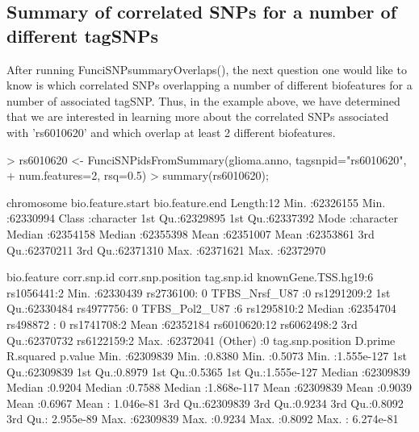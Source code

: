 \documentclass[a4paper]{article}
\begin{document}
\subsection*{Summary of correlated SNPs for a number of different tagSNPs}
After running FunciSNPsummaryOverlaps(), the next question one would like to 
know is which correlated SNPs overlapping a number of different biofeatures 
for a number of associated tagSNP. Thus, in the example above, we have 
determined that we are interested in learning more about the correlated 
SNPs associated with 'rs6010620' and which overlap at least 2 different 
biofeatures.
\begin{Schunk}
\begin{Sinput}
> rs6010620 <- FunciSNPidsFromSummary(glioma.anno, tagsnpid="rs6010620", 
+         num.features=2, rsq=0.5)
> summary(rs6010620);
\end{Sinput}
\begin{Soutput}
  chromosome        bio.feature.start  bio.feature.end   
 Length:12          Min.   :62326155   Min.   :62330994  
 Class :character   1st Qu.:62329895   1st Qu.:62337392  
 Mode  :character   Median :62354158   Median :62355398  
                    Mean   :62351007   Mean   :62353861  
                    3rd Qu.:62370211   3rd Qu.:62371310  
                    Max.   :62371621   Max.   :62372970  
                                                         
             bio.feature    corr.snp.id corr.snp.position      tag.snp.id
 knownGene.TSS.hg19:6    rs1056441:2    Min.   :62330439   rs2736100: 0  
 TFBS_Nrsf_U87     :0    rs1291209:2    1st Qu.:62330484   rs4977756: 0  
 TFBS_Pol2_U87     :6    rs1295810:2    Median :62354704   rs498872 : 0  
                         rs1741708:2    Mean   :62352184   rs6010620:12  
                         rs6062498:2    3rd Qu.:62370732                 
                         rs6122159:2    Max.   :62372041                 
                         (Other)  :0                                     
 tag.snp.position      D.prime         R.squared         p.value          
 Min.   :62309839   Min.   :0.8380   Min.   :0.5073   Min.   :1.555e-127  
 1st Qu.:62309839   1st Qu.:0.8979   1st Qu.:0.5365   1st Qu.:1.555e-127  
 Median :62309839   Median :0.9204   Median :0.7588   Median :1.868e-117  
 Mean   :62309839   Mean   :0.9039   Mean   :0.6967   Mean   : 1.046e-81  
 3rd Qu.:62309839   3rd Qu.:0.9234   3rd Qu.:0.8092   3rd Qu.: 2.955e-89  
 Max.   :62309839   Max.   :0.9234   Max.   :0.8092   Max.   : 6.274e-81  
                                                                          

\end{Soutput}
\end{Schunk}
\end{document}
